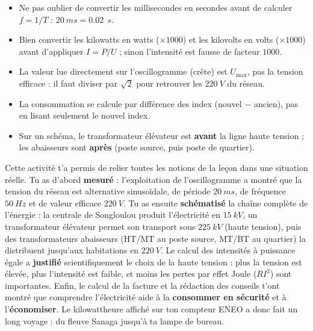 \documentclass[11pt]{article}
\newcounter{popsec}
\newcounter{popsub}
\newcommand{\courssub}[1]{%
  \stepcounter{popsub}%
  \par\vspace{9pt}\noindent{\popxbold\fontsize{11.5}{13}\selectfont\color{popink}{\color{poporange}\thepopsec.\thepopsub}\hspace{6pt}#1}\par\nopagebreak\vspace{4pt}
}
\begin{document}
\begin{attention}
\begin{itemize}
\item Ne pas oublier de convertir les millisecondes en secondes avant de calculer $f = 1/T$ : $\SI{20}{ms} = \num{0,02}\ \SI{}{s}$.
\item Bien convertir les kilowatts en watts ($\times 1000$) et les kilovolts en volts ($\times 1000$) avant d'appliquer $I = P/U$ ; sinon l'intensité est fausse de facteur $1000$.
\item La valeur lue directement sur l'oscillogramme (crête) est $U_{\max}$, pas la tension efficace : il faut diviser par $\sqrt{2}$ pour retrouver les $\SI{220}{V}$ du réseau.
\item La consommation se calcule par différence des index (nouvel $-$ ancien), pas en lisant seulement le nouvel index.
\item Sur un schéma, le transformateur élévateur est \textbf{avant} la ligne haute tension ; les abaisseurs sont \textbf{après} (poste source, puis poste de quartier).
\end{itemize}
\end{attention}

\courssub{Bilan de l'activité}

Cette activité t'a permis de relier toutes les notions de la leçon dans une situation réelle. Tu as d'abord \textbf{mesuré} : l'exploitation de l'oscillogramme a montré que la tension du réseau est alternative sinusoïdale, de période $\SI{20}{ms}$, de fréquence $\SI{50}{Hz}$ et de valeur efficace $\SI{220}{V}$. Tu as ensuite \textbf{schématisé} la chaîne complète de l'énergie : la centrale de Songloulou produit l'électricité en $\SI{15}{kV}$, un transformateur élévateur permet son transport sous $\SI{225}{kV}$ (haute tension), puis des transformateurs abaisseurs (HT/MT au poste source, MT/BT au quartier) la distribuent jusqu'aux habitations en $\SI{220}{V}$. Le calcul des intensités à puissance égale a \textbf{justifié} scientifiquement le choix de la haute tension : plus la tension est élevée, plus l'intensité est faible, et moins les pertes par effet Joule ($R I^2$) sont importantes. Enfin, le calcul de la facture et la rédaction des conseils t'ont montré que comprendre l'électricité aide à la \textbf{consommer en sécurité} et à l'\textbf{économiser}. Le kilowattheure affiché sur ton compteur ENEO a donc fait un long voyage : du fleuve Sanaga jusqu'à ta lampe de bureau.

\newpage
\end{document}
